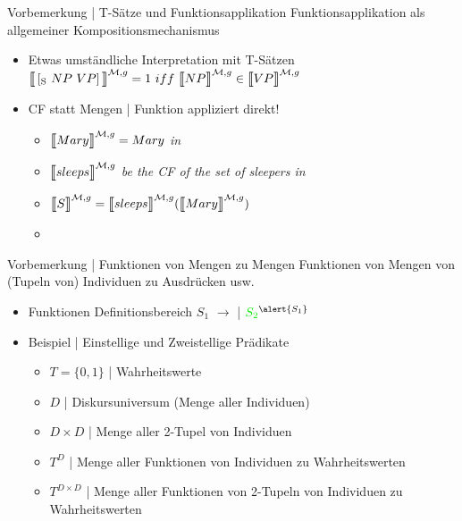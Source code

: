 \begin{frame}
  {Vorbemerkung | T-Sätze und Funktionsapplikation}
  \onslide<+->
  \onslide<+->
  Funktionsapplikation als allgemeiner Kompositionsmechanismus\\
  \Halbzeile
  \begin{itemize}[<+->]
    \item Etwas umständliche Interpretation mit T-Sätzen\\
      \alert{$\Dem{\ekm{\Sub{S}\ NP\ VP}}{\mMm,g} = 1\ iff\ \Dem{NP}{\mMm,g}\in{}\Dem{VP}{\mMm,g}$}
      \Halbzeile
    \item CF statt Mengen | \alert{Funktion appliziert direkt!}\\
      \begin{itemize}[<+->]
        \item $\Dem{Mary}{\mMm,g}=Mary$ \emph{in \mM}
        \item $\Dem{sleeps}{\mMm,g}$ \emph{be the CF of the set of sleepers in \mM}
        \item \alert{$\Dem{S}{\mMm,g}=\Dem{sleeps}{\mMm,g}(\Dem{Mary}{\mMm,g})$}
        \item {}
      \end{itemize}
  \end{itemize}
\end{frame}

\begin{frame}
  {Vorbemerkung | Funktionen von Mengen zu Mengen}
  \onslide<+->
  \onslide<+->
  Funktionen von Mengen von (Tupeln von) Individuen zu Ausdrücken usw.\\
  \Halbzeile
  \begin{itemize}[<+->]
    \item Funktionen \alert{Definitionsbereich $S_1$} $\rightarrow$  | $\gruen{S_2}^{\alert{S_1}}$\\
      \Halbzeile
    \item Beispiel | Einstellige und Zweistellige Prädikate
      \begin{itemize}[<+->]
        \item $T=\{0,1\}$ | Wahrheitswerte
        \item $D$ | Diskursuniversum (Menge aller Individuen)
        \item $D\times D$ | Menge aller 2-Tupel von Individuen
          \Viertelzeile
        \item \alert{$T^D$} | Menge aller Funktionen von Individuen zu Wahrheitswerten\\
          \Viertelzeile
        \item \alert{$T^{D\times D}$} | Menge aller Funktionen von 2-Tupeln von Individuen zu Wahrheitswerten\\
      \end{itemize}
  \end{itemize}
\end{frame}

